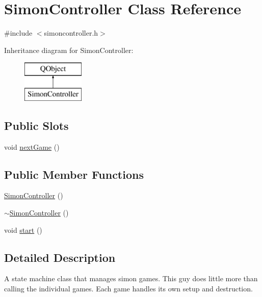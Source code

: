 \hypertarget{class_simon_controller}{\section{Simon\+Controller Class Reference}
\label{class_simon_controller}
}


{\ttfamily \#include $<$simoncontroller.\+h$>$}

Inheritance diagram for Simon\+Controller\+:\begin{figure}[H]
\begin{center}
\leavevmode
\includegraphics[height=2.000000cm]{class_simon_controller}
\end{center}
\end{figure}
\subsection*{Public Slots}
\begin{DoxyCompactItemize}
\item 
void \hyperlink{class_simon_controller_a192ee3ae7fa66e2c7ca71c504884dc26}{next\+Game} ()
\end{DoxyCompactItemize}
\subsection*{Public Member Functions}
\begin{DoxyCompactItemize}
\item 
\hyperlink{class_simon_controller_a16bdca59b946631ef5542dd351b8ca1a}{Simon\+Controller} ()
\item 
\hyperlink{class_simon_controller_a7690ecb37c9c83a6c0b0bc6000f9c16e}{$\sim$\+Simon\+Controller} ()
\item 
void \hyperlink{class_simon_controller_ac3d7312cfdfceb9bde664bd691b5d871}{start} ()
\end{DoxyCompactItemize}


\subsection{Detailed Description}
A state machine class that manages simon games. This guy does little more than calling the individual games. Each game handles its own setup and destruction. 

